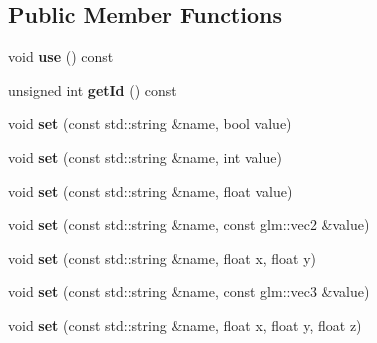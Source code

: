 \subsection*{Public Member Functions}
\begin{DoxyCompactItemize}
\item 
\mbox{\label{classTarbora_1_1Shader_af0e90a915607963668d66f25bc055892}} 
void {\bfseries use} () const
\item 
\mbox{\label{classTarbora_1_1Shader_ac0ce2bdbb931a1900e6a7091879fb729}} 
unsigned int {\bfseries get\+Id} () const
\item 
\mbox{\label{classTarbora_1_1Shader_aa5965bdbd6b10feba1a3b990383e0ee7}} 
void {\bfseries set} (const std\+::string \&name, bool value)
\item 
\mbox{\label{classTarbora_1_1Shader_ac38c7661b8ff5454c07084866283af16}} 
void {\bfseries set} (const std\+::string \&name, int value)
\item 
\mbox{\label{classTarbora_1_1Shader_a0d06c47a3aa45626a6fb629511f617e4}} 
void {\bfseries set} (const std\+::string \&name, float value)
\item 
\mbox{\label{classTarbora_1_1Shader_acc3ed2823b0c52c46a065f9a430f6d4a}} 
void {\bfseries set} (const std\+::string \&name, const glm\+::vec2 \&value)
\item 
\mbox{\label{classTarbora_1_1Shader_ad1e8a78b505e09eb87807ae9e683f1ea}} 
void {\bfseries set} (const std\+::string \&name, float x, float y)
\item 
\mbox{\label{classTarbora_1_1Shader_a28919ca096895a47930385fd79cccca7}} 
void {\bfseries set} (const std\+::string \&name, const glm\+::vec3 \&value)
\item 
\mbox{\label{classTarbora_1_1Shader_aebcaeb26e8e890b7013f802dc4a9b92b}} 
void {\bfseries set} (const std\+::string \&name, float x, float y, float z)
\item 
\mbox{\label{classTarbora_1_1Shader_a9ea26e99b66fb023046ee0114d362f6a}} 

\end{DoxyCompactItemize}
